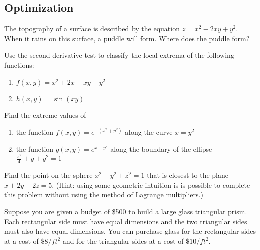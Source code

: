 
\newpage
\subsection{Optimization}

\BEN

\item %
The topography of a surface is described by the equation $z=x^2-2xy+y^2$. When it rains on this surface, a puddle will form. Where does the puddle form? 
\item

Use the second derivative test to classify the local extrema of the
following functions:
\begin{enumerate}
 \item $f(x,y) = x^2 + 2x - xy + y^2$
 \item $h(x,y) = \sin(xy)$
\end{enumerate}

\item

Find the extreme values of
\begin{enumerate}
 \item the function
  $f(x,y) = e^{-(x^2+y^2)}$
  along the curve $x = y^2$
 \item the function
  $g(x,y) = e^{x-y^2}$ along the boundary of the ellipse
  $\frac{x^2}{4}+y+y^2=1$
\end{enumerate}

\item

Find the point on the sphere $x^2 + y^2 + z^2 = 1$ that is closest
to the plane $x + 2y + 2z = 5$. (Hint: using some geometric intuition
is is possible to complete this problem without using the method of
Lagrange multipliers.)

\item
{}

Suppose you are given a budget of \$500 to build a large glass
triangular prism.  Each rectangular side must have equal dimensions
and the two triangular sides must also have equal dimensions.  You
can purchase glass for the rectangular sides at a cost of $\$8/ft^2$
and for the triangular sides at a cost of $\$10/ft^2$.


